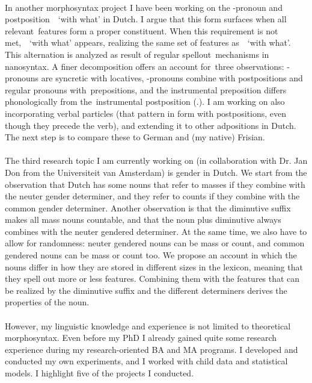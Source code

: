 \documentclass[12pt]{article}
\begin{document}
\phantom{x}\\

In another morphosyntax project I have been working on the -pronoun and postposition  `with what’ in Dutch. I argue that this form surfaces when all relevant features form a proper constituent. When this requirement is not met,  `with what’ appears, realizing the same set of features as  `with what'. This alternation is analyzed as result of regular spellout mechanisms in nanosyntax. A finer decomposition offers an account for three observations: -pronouns are syncretic with locatives, -pronouns combine with postpositions and regular pronouns with prepositions, and the instrumental preposition differs phonologically from the instrumental postposition (.). I am working on also incorporating verbal particles (that pattern in form with postpositions, even though they precede the verb), and extending it to other adpositions in Dutch. The next step is to compare these to German and (my native) Frisian.\\

\phantom{x}\\

The third research topic I am currently working on (in collaboration with Dr. Jan Don from the Universiteit van Amsterdam) is gender in Dutch. We start from the observation that Dutch has some nouns that refer to masses if they combine with the neuter gender determiner, and they refer to counts if they combine with the common gender determiner. Another observation is that the diminutive suffix makes all mass nouns countable, and that the noun plus diminutive always combines with the neuter gendered determiner. At the same time, we also have to allow for randomness: neuter gendered nouns can be mass or count, and common gendered nouns can be mass or count too. We propose an account in which the nouns differ in how they are stored in different sizes in the lexicon, meaning that they spell out more or less features. Combining them with the features that can be realized by the diminutive suffix and the different determiners derives the properties of the noun.\\

\phantom{x}\\

However, my linguistic knowledge and experience is not limited to theoretical morphosyntax. Even before my PhD I already gained quite some research experience during my research-oriented BA and MA programs. I developed and conducted my own experiments, and I worked with child data and statistical models. I highlight five of the projects I conducted.\\
\end{document}
